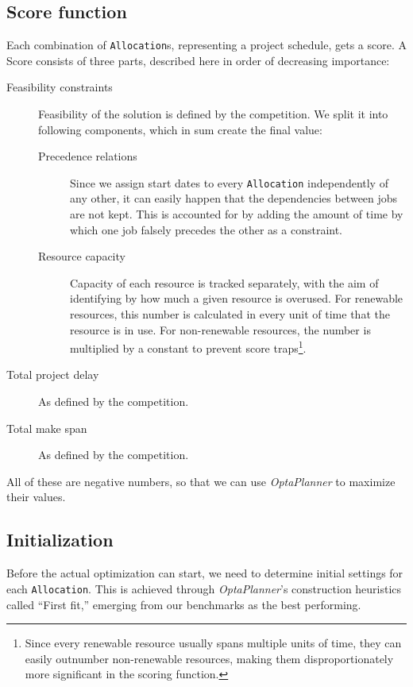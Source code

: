 \documentclass[10pt,a4paper]{article}
\begin{document}
\subsection{Score function}

Each combination of \texttt{Allocation}s, representing a project schedule, gets a score. A Score consists of three parts, described here in order of decreasing importance:

\begin{description}
\item[Feasibility constraints] Feasibility of the solution is defined by the competition. We split it into following components, which in sum create the final value:

\begin{description}
\item[Precedence relations] Since we assign start dates to every \texttt{Allocation} independently of any other, it can easily happen that the dependencies between jobs are not kept. This is accounted for by adding the amount of time by which one job falsely precedes the other as a constraint.
\item[Resource capacity] Capacity of each resource is tracked separately, with the aim of identifying by how much a given resource is overused. For renewable resources, this number is calculated in every unit of time that the resource is in use. For non-renewable resources, the number is multiplied by a constant to prevent score traps\footnote{Since every renewable resource usually spans multiple units of time, they can easily outnumber non-renewable resources, making them disproportionately more significant in the scoring function.}.
\end{description}

\item[Total project delay] As defined by the competition.
\item[Total make span] As defined by the competition.
\end{description}

All of these are negative numbers, so that we can use \textit{OptaPlanner} to maximize their values.

\subsection{Initialization}

Before the actual optimization can start, we need to determine initial settings for each \texttt{Allocation}. This is achieved through \textit{OptaPlanner}'s construction heuristics called ``First fit,'' emerging from our benchmarks as the best performing.
\end{document}
